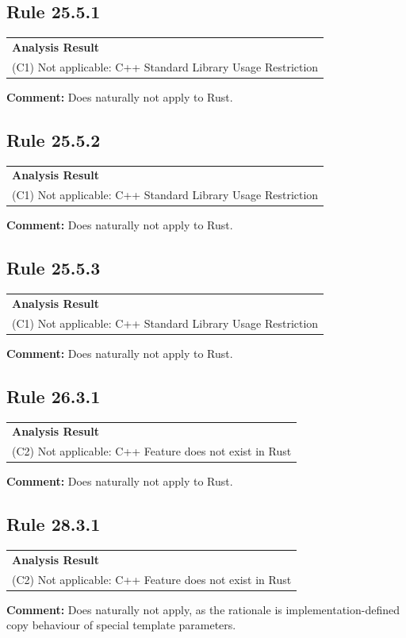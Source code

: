 \subsection*{Rule 25.5.1}
\begin{longtable}{p{13cm}}
\textbf{Analysis Result} \\
(C1) Not applicable: C++ Standard Library Usage Restriction \\
\end{longtable}
\textbf{Comment:} Does naturally not apply to Rust. \\
\subsection*{Rule 25.5.2}
\begin{longtable}{p{13cm}}
\textbf{Analysis Result} \\
(C1) Not applicable: C++ Standard Library Usage Restriction \\
\end{longtable}
\textbf{Comment:} Does naturally not apply to Rust. \\
\subsection*{Rule 25.5.3}
\begin{longtable}{p{13cm}}
\textbf{Analysis Result} \\
(C1) Not applicable: C++ Standard Library Usage Restriction \\
\end{longtable}
\textbf{Comment:} Does naturally not apply to Rust. \\
\subsection*{Rule 26.3.1}
\begin{longtable}{p{13cm}}
\textbf{Analysis Result} \\
(C2) Not applicable: C++ Feature does not exist in Rust \\
\end{longtable}
\textbf{Comment:} Does naturally not apply to Rust. \\
\subsection*{Rule 28.3.1}
\begin{longtable}{p{13cm}}
\textbf{Analysis Result} \\
(C2) Not applicable: C++ Feature does not exist in Rust \\
\end{longtable}
\textbf{Comment:} Does naturally not apply, as the rationale is implementation-defined copy behaviour of special template parameters. \\
